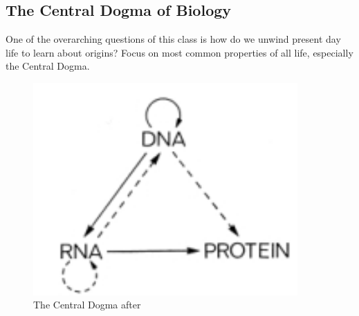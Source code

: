 \documentclass[]{article}
\begin{document}
\subsection{The Central Dogma of Biology}\label{sect:central_dogma}

One of the overarching questions of this class is how do we unwind present day life to learn about origins? Focus on most common properties of all life, especially the Central Dogma.\cite{crick1958biological} \cite{crick1970central}

\begin{figure}[H]
	\caption[The Central Dogma]{The Central Dogma after \cite{crick1970central}}\label{fig:CentralDogma} 
	\includegraphics[width=0.9\textwidth]{CentralDogma}
\end{figure}
\end{document}
